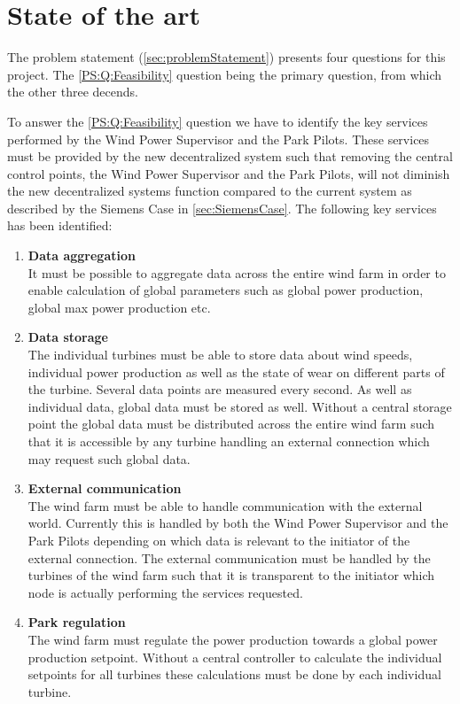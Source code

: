 \chapter{State of the art}\label{cha:stateOfTheArt}

The problem statement (\cref{sec:problemStatement}) presents four questions for this project. The \ref{PS:Q:Feasibility} question being the primary question, from which the other three decends. 

To answer the \ref{PS:Q:Feasibility} question we have to identify the key services performed by the Wind Power Supervisor and the Park Pilots. These services must be provided by the new decentralized system such that removing the central control points, the Wind Power Supervisor and the Park Pilots, will not diminish the new decentralized systems function compared to the current system as described by the Siemens Case in \cref{sec:SiemensCase}. The following key services has been identified:

\begin{enumerate}[label=\textbf{\alph*.}, ref=\textit{\alph*}]
\item \label{Analysis:need:a} \textbf{Data aggregation} \\
	It must be possible to aggregate data across the entire wind farm in order to enable calculation of global parameters such as global power production, global max power production etc. 

\item \label{Analysis:need:b} \textbf{Data storage} \\
	The individual turbines must be able to store data about wind speeds, individual power production as well as the state of wear on different parts of the turbine. Several data points are measured every second. As well as individual data, global data must be stored as well. Without a central storage point the global data must be distributed across the entire wind farm such that it is accessible by any turbine handling an external connection which may request such global data.

\item \label{Analysis:need:c} \textbf{External communication} \\
	The wind farm must be able to handle communication with the external world. Currently this is handled by both the Wind Power Supervisor and the Park Pilots depending on which data is relevant to the initiator of the external connection. The external communication must be handled by the turbines of the wind farm such that it is transparent to the initiator which node is actually performing the services requested.

\item \label{Analysis:need:d} \textbf{Park regulation} \\
	The wind farm must regulate the power production towards a global power production setpoint. Without a central controller to calculate the individual setpoints for all turbines these calculations must be done by each individual turbine.
	
\end{enumerate}

